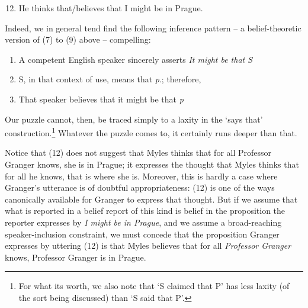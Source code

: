 \begin{enumerate}
\setcounter{enumi}{11} 
\item He thinks that/believes that I might be in Prague.
\end{enumerate}

\noindent Indeed, we in general tend find the following inference pattern -- a belief-theoretic version of (7) to (9) above -- compelling: 

\begin{enumerate}
\renewcommand{\labelenumi}{(\roman{enumi})}
\item A competent English speaker sincerely asserts \textit{It might be that S }
\item S, in that context of use, means that \textit{p}.; therefore,
\item That speaker believes that it might be that \textit{p}
\end{enumerate}
\renewcommand{\labelenumi}{(\arabic{enumi})} 

\noindent Our puzzle cannot, then, be traced simply to a laxity in the `says that' construction.\footnote{For what its worth, we also note that `S claimed that P' has less laxity (of the sort being discussed) than `S said that P'.} Whatever the puzzle comes to, it certainly runs deeper than that. 
 
Notice that (12) does not suggest that Myles thinks that for all Professor Granger knows, she is in Prague; it expresses the thought that Myles thinks that for all he knows, that is where she is. Moreover, this is hardly a case where Granger's utterance is of doubtful appropriateness: (12) is one of the ways canonically available for Granger to express that thought. But if we assume that what is reported in a belief report of this kind is belief in the proposition the reporter expresses by \textit{I might be in Prague}, and we assume a broad-reaching speaker-inclusion constraint, we must concede that the proposition Granger expresses by uttering (12) is that Myles believes that for all \textit{Professor Granger }knows, Professor Granger is in Prague.
 
